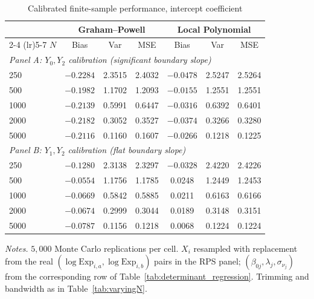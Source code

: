 \documentclass{article}
\begin{document}
\begin{table}[htbp]
\centering
\caption{Calibrated finite-sample performance, intercept coefficient}
\label{tab:calibrated_sim}
\begin{tabular}{lcccccc}
\hline\hline
& \multicolumn{3}{c}{Graham--Powell} & \multicolumn{3}{c}{Local Polynomial} \\
\cmidrule(lr){2-4} \cmidrule(lr){5-7}
$N$ & Bias & Var & MSE & Bias & Var & MSE \\
\hline
\multicolumn{7}{l}{\emph{Panel A: $Y_0,Y_2$ calibration (significant boundary slope)}} \\
250   & $-0.2284$ & 2.3515 & 2.4032 & $-0.0478$ & 2.5247 & 2.5264 \\
500   & $-0.1982$ & 1.1702 & 1.2093 & $-0.0155$ & 1.2551 & 1.2551 \\
1000  & $-0.2139$ & 0.5991 & 0.6447 & $-0.0316$ & 0.6392 & 0.6401 \\
2000  & $-0.2182$ & 0.3052 & 0.3527 & $-0.0374$ & 0.3266 & 0.3280 \\
5000  & $-0.2116$ & 0.1160 & 0.1607 & $-0.0266$ & 0.1218 & 0.1225 \\
\hline
\multicolumn{7}{l}{\emph{Panel B: $Y_1,Y_2$ calibration (flat boundary slope)}} \\
250   & $-0.1280$ & 2.3138 & 2.3297 & $-0.0328$ & 2.4220 & 2.4226 \\
500   & $-0.0554$ & 1.1756 & 1.1785 & \phantom{$-$}0.0248  & 1.2449 & 1.2453 \\
1000  & $-0.0669$ & 0.5842 & 0.5885 & \phantom{$-$}0.0211  & 0.6163 & 0.6166 \\
2000  & $-0.0674$ & 0.2999 & 0.3044 & \phantom{$-$}0.0189  & 0.3148 & 0.3151 \\
5000  & $-0.0787$ & 0.1156 & 0.1218 & \phantom{$-$}0.0068  & 0.1224 & 0.1224 \\
\hline\hline
\end{tabular}

\vspace{0.4em}
\begin{minipage}{0.92\textwidth}
\footnotesize \emph{Notes.} $5{,}000$ Monte Carlo replications per cell. $X_i$ resampled with replacement from the real $(\log\text{Exp}_{i,a},\log\text{Exp}_{i,b})$ pairs in the RPS panel; $(\beta_{0j},\lambda_j,\sigma_{\nu_j})$ from the corresponding row of Table~\ref{tab:determinant_regression}. Trimming and bandwidth as in Table~\ref{tab:varyingN}.
\end{minipage}
\end{table}
\end{document}
